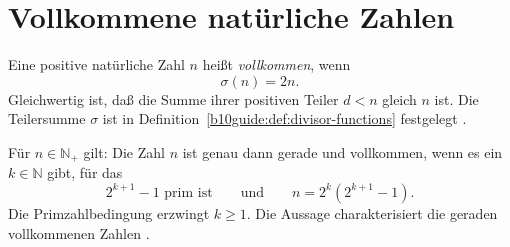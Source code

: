 \section{Vollkommene natürliche Zahlen}

\begin{definition}
\label{b10guide:def:perfect-number}
Eine positive natürliche Zahl $n$ heißt \emph{vollkommen}, wenn
\[
 \sigma(n)=2n.
\]
Gleichwertig ist, daß die Summe ihrer positiven Teiler $d<n$
gleich $n$ ist. Die Teilersumme $\sigma$ ist in
Definition~\ref{b10guide:def:divisor-functions} festgelegt
\cite{natperfect}.
\end{definition}

\begin{theorem}
\label{b10guide:thm:euclid-euler-perfect}
Für $n\in\mathbb N_+$ gilt: Die Zahl $n$ ist genau dann gerade
und vollkommen, wenn es ein $k\in\mathbb N$ gibt, für das
\[
 2^{k+1}-1\text{ prim ist}
 \qquad\text{und}\qquad
 n=2^k(2^{k+1}-1).
\]
Die Primzahlbedingung erzwingt $k\ge1$. Die Aussage
charakterisiert die geraden vollkommenen Zahlen \cite{natperfect}.
\end{theorem}
